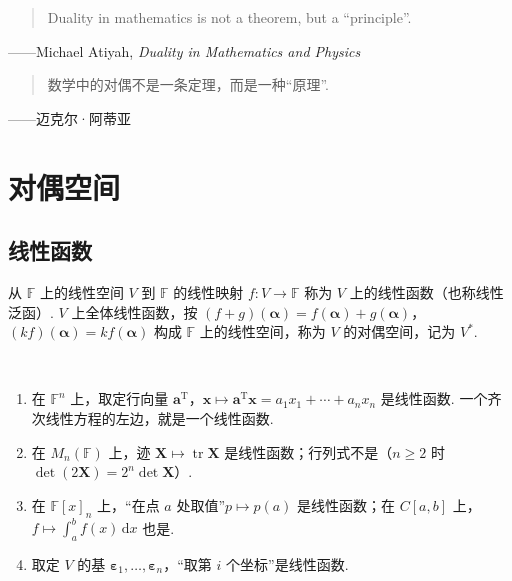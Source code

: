 \documentclass[lang=cn,10.5pt,scheme=chinese,toc=twocol,section,chinesefont=nofont,
twoside,citestyle=gb7714-2015,bibstyle=gb7714-2015]{elegantbook}
\DeclareRobustCommand{\textbf}[1]{{\lnsemiboldlatin\lnsemiboldcjk #1}}
\newcommand{\vv}[1]{\boldsymbol{#1}}
\newcommand{\trans}{\mathrm{T}}             %
\numberwithin{equation}{section}   %
\newcommand*{\lnlabel}[1]{{\sffamily\bfseries\color{black}#1}}
\renewenvironment{example}[1][]{%
	\refstepcounter{exam}%
	\par\noindent\lnlabel{\examplename\ \theexam\ifblank{#1}{}{\ #1}}\ \rmfamily}{%
	\par\ignorespacesafterend}
\begin{document}
\newpage
\begin{tcolorbox}[epigraph, epigraph image*={0.3\linewidth}{image/atiyah.jpg}{迈克尔·阿蒂亚}{fig:atiyah}]
  \begin{quote}
    Duality in mathematics is not a theorem, but a “principle”.
  \end{quote}
  \begin{flushright}
    ——Michael Atiyah, \textit{Duality in Mathematics and Physics}
  \end{flushright}
  \begin{quote}
    数学中的对偶不是一条定理，而是一种“原理”.
  \end{quote}
  \begin{flushright}
    ——迈克尔·阿蒂亚\footnotemark
  \end{flushright}
\end{tcolorbox}

\section{对偶空间}

\subsection{线性函数}

\begin{definition}
  从 $\mathbb{F}$ 上的线性空间 $V$ 到 $\mathbb{F}$ 的线性映射 $f:V\to\mathbb{F}$ 称为 $V$ 上的\textbf{线性函数}（也称\textbf{线性泛函}）. $V$ 上全体线性函数，按 $(f+g)(\vv\alpha)=f(\vv\alpha)+g(\vv\alpha)$，$(kf)(\vv\alpha)=kf(\vv\alpha)$ 构成 $\mathbb{F}$ 上的线性空间，称为 $V$ 的\textbf{对偶空间}，记为 $V^*$.
\end{definition}

\begin{example}
  \begin{enumerate}
    \item 在 $\mathbb{F}^n$ 上，取定行向量 $\vv a^\trans$，$\vv x\mapsto\vv a^\trans\vv x=a_1x_1+\cdots+a_nx_n$ 是线性函数. 一个齐次线性方程的左边，就是一个线性函数.
    \item 在 $M_n(\mathbb{F})$ 上，迹 $\vv X\mapsto\operatorname{tr}\vv X$ 是线性函数；行列式\textbf{不是}（$n\ge2$ 时 $\det(2\vv X)=2^n\det\vv X$）.
    \item 在 $\mathbb{F}[x]_n$ 上，“在点 $a$ 处取值”$p\mapsto p(a)$ 是线性函数；在 $C[a,b]$ 上，$f\mapsto\int_a^bf(x)\,\mathrm dx$ 也是.
    \item 取定 $V$ 的基 $\vv\varepsilon_1,\ldots,\vv\varepsilon_n$，“取第 $i$ 个坐标”是线性函数.
  \end{enumerate}
\end{example}
\end{document}
